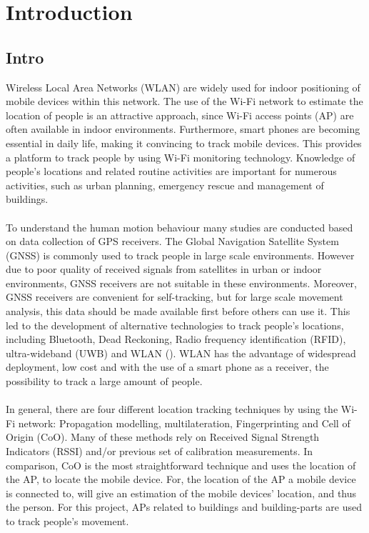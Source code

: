 \chapter{Introduction}\label{Introduction}
\section{Intro}\label{intro}
Wireless Local Area Networks (WLAN) are widely used for indoor positioning of mobile devices within this network. The use of the Wi-Fi network to estimate the location of people is an attractive approach, since Wi-Fi access points (AP) are often available in indoor environments. Furthermore, smart phones are becoming essential in daily life, making it convincing to track mobile devices. This provides a platform to track people by using Wi-Fi monitoring technology. Knowledge of people’s locations and related routine activities are important for numerous activities, such as urban planning, emergency rescue and management of buildings.\\\\
To understand the human motion behaviour many studies are conducted based on data collection of GPS receivers. The Global Navigation Satellite System (GNSS) is commonly used to track people in large scale environments. However due to poor quality of received signals from satellites in urban or indoor environments, GNSS receivers are not suitable in these environments. Moreover, GNSS receivers are convenient for self-tracking, but for large scale movement analysis, this data should be made available first before others can use it. This led to the development of alternative technologies to track people’s locations, including Bluetooth, Dead Reckoning, Radio frequency identification (RFID), ultra-wideband (UWB) and WLAN (\cite{mautz2012indoor}). WLAN has the advantage of widespread deployment, low cost and with the use of a smart phone as a receiver, the possibility to track a large amount of people.\\\\
In general, there are four different location tracking techniques by using the Wi-Fi network: Propagation modelling, multilateration, Fingerprinting and Cell of Origin (CoO). Many of these methods rely on Received Signal Strength Indicators (RSSI) and/or previous set of calibration measurements. In comparison, CoO is the most straightforward technique and uses the location of the AP, to locate the mobile device. For, the location of the AP a mobile device is connected to, will give an estimation of the mobile devices' location, and thus the person. For this project, APs related to buildings and building-parts are used to track people’s movement.\\\\
